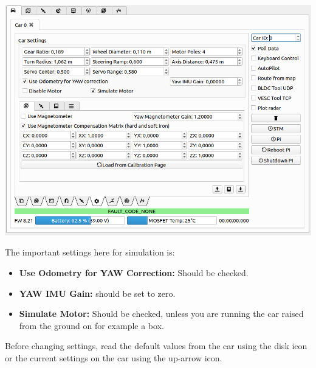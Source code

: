 \documentclass[12pt]{article} %
\begin{document}
\noindent\begin{minipage}{0.5\linewidth}
\noindent \includegraphics[width=\textwidth]{./screens/car_tab_simulate.png}
\end{minipage}
\noindent\begin{minipage}{0.5\linewidth}
The important settings here for simulation is:
\begin{itemize}
\item {\bf Use Odometry for YAW Correction:} Should be checked.
\item {\bf YAW IMU Gain:} should be set to zero.
\item {\bf Simulate Motor:} Should be checked, unless you are running
  the car raised from the ground on for example a box.
\end{itemize}
Before changing settings, read the default values from the car using
the disk icon or the current settings on the car using the up-arrow
icon.
\end{minipage}
\end{document}
